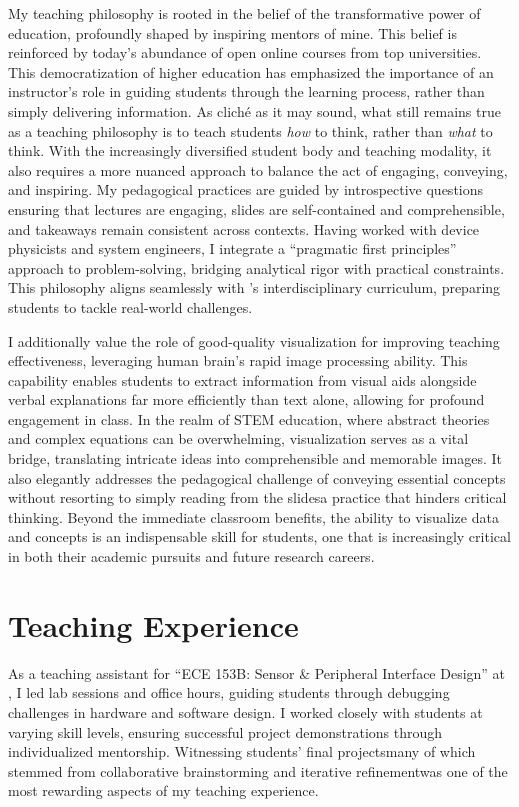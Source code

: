 My teaching philosophy is rooted in the belief of the transformative power of education, profoundly shaped by inspiring mentors of mine. This belief is reinforced by today's abundance of open online courses from top universities. This democratization of higher education has emphasized the importance of an instructor's role in guiding students through the learning process, rather than simply delivering information. As cliché as it may sound, what still remains true as a teaching philosophy is to teach students \emph{how} to think, rather than \emph{what} to think. With the increasingly diversified student body and teaching modality, it also requires a more nuanced approach to balance the act of engaging, conveying, and inspiring. My pedagogical practices are guided by introspective questions ensuring that lectures are engaging, slides are self-contained and comprehensible, and takeaways remain consistent across contexts. Having worked with device physicists and system engineers, I integrate a “pragmatic first principles” approach to problem-solving, bridging analytical rigor with practical constraints. This philosophy aligns seamlessly with \appSchoolDeptShort{}'s interdisciplinary curriculum, preparing students to tackle real-world challenges.

I additionally value the role of good-quality visualization for improving teaching effectiveness, leveraging human brain's rapid image processing ability. This capability enables students to extract information from visual aids alongside verbal explanations far more efficiently than text alone, allowing for profound engagement in class. In the realm of STEM education, where abstract theories and complex equations can be overwhelming, visualization serves as a vital bridge, translating intricate ideas into comprehensible and memorable images. It also elegantly addresses the pedagogical challenge of conveying essential concepts without resorting to simply reading from the slides\textemdash a practice that hinders critical thinking. Beyond the immediate classroom benefits, the ability to visualize data and concepts is an indispensable skill for students, one that is increasingly critical in both their academic pursuits and future research careers.

\section*{Teaching Experience}
As a teaching assistant for “ECE 153B: Sensor \& Peripheral Interface Design” at \myPhDSchoolShort{}, I led lab sessions and office hours, guiding students through debugging challenges in hardware and software design. I worked closely with students at varying skill levels, ensuring successful project demonstrations through individualized mentorship. Witnessing students' final projects\textemdash{}many of which stemmed from collaborative brainstorming and iterative refinement\textemdash{}was one of the most rewarding aspects of my teaching experience.

